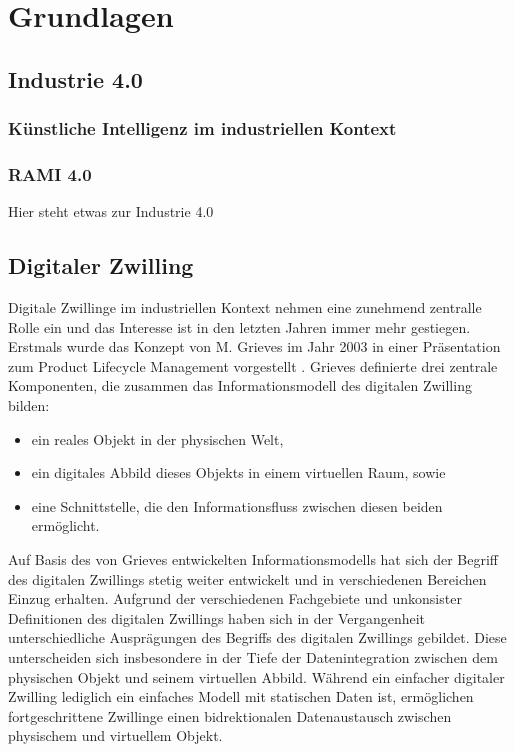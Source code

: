 \section{Grundlagen}
\subsection{Industrie 4.0}
\subsubsection{Künstliche Intelligenz im industriellen Kontext}
\subsubsection{RAMI 4.0}
Hier steht etwas zur Industrie 4.0


\newpage
\subsection{Digitaler Zwilling}
Digitale Zwillinge im industriellen Kontext nehmen eine zunehmend zentralle Rolle ein und das Interesse ist in den letzten Jahren immer mehr gestiegen.
Erstmals wurde das Konzept von M. Grieves im Jahr 2003 in einer Präsentation zum Product Lifecycle Management vorgestellt \cite{DTGrieves}. 
Grieves definierte drei zentrale Komponenten, die zusammen das Informationsmodell des digitalen Zwilling bilden:
\begin{itemize}
    \item ein reales Objekt in der physischen Welt,
    \item ein digitales Abbild dieses Objekts in einem virtuellen Raum, sowie
    \item eine Schnittstelle, die den Informationsfluss zwischen diesen beiden ermöglicht.
\end{itemize}

Auf Basis des von Grieves entwickelten Informationsmodells hat sich der Begriff des digitalen Zwillings stetig weiter entwickelt und in verschiedenen Bereichen Einzug erhalten. 
Aufgrund der verschiedenen Fachgebiete und unkonsister Definitionen des digitalen Zwillings haben sich in der Vergangenheit unterschiedliche Ausprägungen des Begriffs des digitalen Zwillings gebildet.
Diese unterscheiden sich insbesondere in der Tiefe der Datenintegration zwischen dem physischen Objekt und seinem virtuellen Abbild.
Während ein einfacher digitaler Zwilling lediglich ein einfaches Modell mit statischen Daten ist, ermöglichen fortgeschrittene Zwillinge einen bidrektionalen Datenaustausch zwischen physischem und virtuellem Objekt. 

